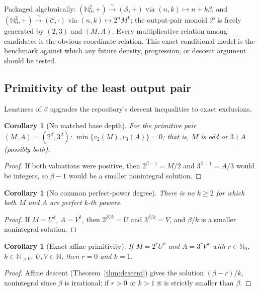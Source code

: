 \documentclass[11pt,oneside]{article}
\newtheorem{corollary}[theorem]{Corollary}
\theoremstyle{definition}
\theoremstyle{remark}
\newcommand{\N}{\mathbb N}
\newcommand{\Nzero}{\mathbb N_0}
\newcommand{\Sol}{\mathcal S}
\newcommand{\Cand}{\mathcal C}
\newcommand{\Pair}{\mathcal P}
\begin{document}
Packaged algebraically: $(\Nzero^2,+)\xrightarrow{\ \sim\ }(\Sol,+)$ via
$(n,k)\mapsto n+k\beta$, and $(\Nzero^2,+)\xrightarrow{\ \sim\ }(\Cand,\cdot)$ via
$(n,k)\mapsto2^nM^k$; the output-pair monoid $\Pair$ is freely generated by $(2,3)$ and
$(M,A)$.  Every multiplicative relation among candidates is the obvious coordinate
relation.  This exact conditional model is the benchmark against which any future density,
progression, or descent argument should be tested.

\subsection{Primitivity of the least output pair}

Leastness of $\beta$ upgrades the repository's descent inequalities to exact exclusions.

\begin{corollary}[No matched base depth]
\label{cor:no-depth}
For the primitive pair $(M,A)=(2^{\beta},3^{\beta})$:
$\min\{v_2(M),v_3(A)\}=0$; that is, $M$ is odd or $3\nmid A$ (possibly both).
\end{corollary}

\begin{proof}
If both valuations were positive, then $2^{\beta-1}=M/2$ and $3^{\beta-1}=A/3$ would be
integers, so $\beta-1$ would be a smaller nonintegral solution.
\end{proof}

\begin{corollary}[No common perfect-power degree]
\label{cor:no-common-power}
There is no $k\ge2$ for which both $M$ and $A$ are perfect $k$-th powers.
\end{corollary}

\begin{proof}
If $M=U^k$, $A=V^k$, then $2^{\beta/k}=U$ and $3^{\beta/k}=V$, and $\beta/k$ is a smaller
nonintegral solution.
\end{proof}

\begin{corollary}[Exact affine primitivity]
\label{cor:affine-primitive}
If $M=2^rU^k$ and $A=3^rV^k$ with $r\in\Nzero$, $k\in\N_{>0}$, $U,V\in\N$, then $r=0$ and
$k=1$.
\end{corollary}

\begin{proof}
Affine descent (Theorem~\ref{thm:descent}) gives the solution $(\beta-r)/k$, nonintegral since
$\beta$ is irrational; if $r>0$ or $k>1$ it is strictly smaller than $\beta$.
\end{proof}
\end{document}
